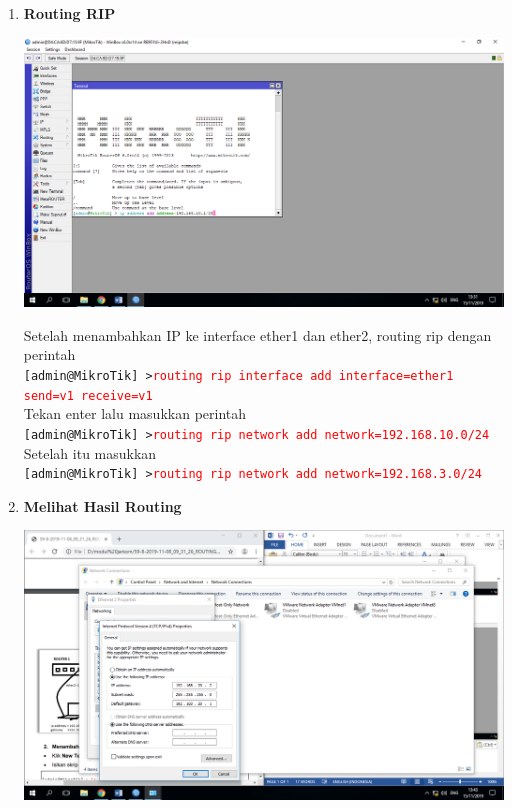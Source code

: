 \documentclass[a4paper,12pt]{article}
\begin{document}
\begin{enumerate}
	\item \textbf{Routing RIP\\}
	\begin{center}
		\includegraphics[scale=.4]{Page-2-Image-3}
	\end{center}
	Setelah menambahkan IP ke interface ether1 dan ether2, routing rip dengan perintah\\
	\texttt{[admin@MikroTik] >\textcolor{red}{routing rip interface add interface=ether1 send=v1 receive=v1}}\\
	Tekan enter lalu masukkan perintah\\
	\texttt{[admin@MikroTik] >\textcolor{red}{routing rip network add network=192.168.10.0/24}}\\
	Setelah itu masukkan\\
	\texttt{[admin@MikroTik] >\textcolor{red}{routing rip network add network=192.168.3.0/24}}
	
	\item \textbf{Melihat Hasil Routing}
	\begin{center}
		\includegraphics[scale=.4]{Page-2-Image-4}
	\end{center}
	
\end{enumerate}
\end{document}
